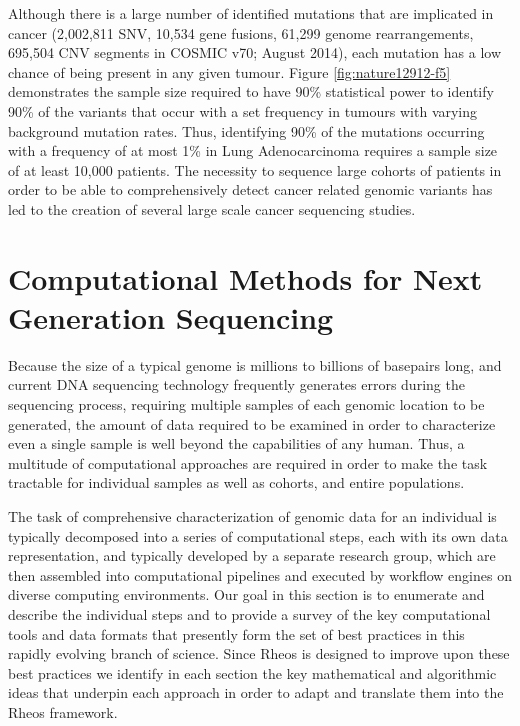 Although there is a large number of identified mutations that are implicated in cancer (2,002,811 SNV,  10,534 gene fusions, 61,299 genome rearrangements, 695,504 CNV segments in COSMIC v70; August 2014)\autocite{forbes2015cosmic}, each mutation has a low chance of being present in any given tumour. Figure \ref{fig:nature12912-f5} demonstrates the sample size required to have 90\% statistical power to identify  90\% of the variants that occur with a set frequency in tumours with varying background mutation rates. Thus, identifying 90\% of the mutations occurring with a frequency of at most 1\% in Lung Adenocarcinoma requires a sample size of at least 10,000 patients. The necessity to sequence large cohorts of patients in order to be able to comprehensively detect  cancer related genomic variants has led to the creation of several large scale cancer sequencing studies.

\section{Computational Methods for Next Generation Sequencing}
Because the size of a typical genome is millions to billions of basepairs long, and current DNA sequencing technology frequently generates errors during the sequencing process, requiring multiple samples of each genomic location to be generated, the amount of data required to be examined in order to characterize even a single sample is well beyond the capabilities of any human. Thus, a multitude of computational approaches are required in order to make the task tractable for individual samples as well as cohorts, and entire populations.

The task of comprehensive characterization of genomic data for an individual is typically decomposed into a series of computational steps, each with its own data representation, and typically developed by a separate research group, which are then assembled into computational pipelines and executed by workflow engines on diverse computing environments. Our goal in this section is to enumerate and describe the individual steps and to provide a survey of the key computational tools and data formats that presently form the set of best practices in this rapidly evolving branch of science. Since Rheos is designed to improve upon these best practices we identify in each section the key mathematical and algorithmic ideas that underpin each approach in order to adapt and translate them into the Rheos framework.

